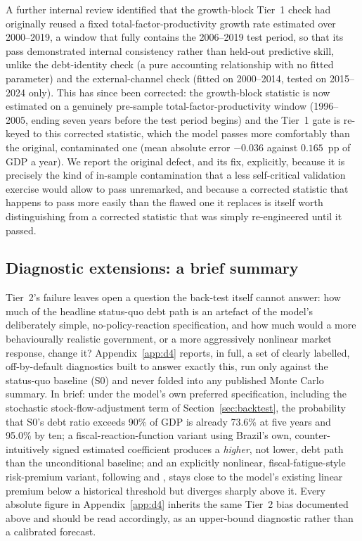 \documentclass[11pt,a4paper]{article}
\begin{document}
A further internal review identified that the growth-block Tier~1 check had originally reused a fixed total-factor-productivity growth rate estimated over 2000--2019, a window that fully contains the 2006--2019 test period, so that its pass demonstrated internal consistency rather than held-out predictive skill, unlike the debt-identity check (a pure accounting relationship with no fitted parameter) and the external-channel check (fitted on 2000--2014, tested on 2015--2024 only). This has since been corrected: the growth-block statistic is now estimated on a genuinely pre-sample total-factor-productivity window (1996--2005, ending seven years before the test period begins) and the Tier~1 gate is re-keyed to this corrected statistic, which the model passes more comfortably than the original, contaminated one (mean absolute error $-0.036$ against $0.165$~pp of GDP a year). We report the original defect, and its fix, explicitly, because it is precisely the kind of in-sample contamination that a less self-critical validation exercise would allow to pass unremarked, and because a corrected statistic that happens to pass more easily than the flawed one it replaces is itself worth distinguishing from a corrected statistic that was simply re-engineered until it passed.

\subsection{Diagnostic extensions: a brief summary}
\label{sec:d4}

Tier~2's failure leaves open a question the back-test itself cannot answer: how much of the headline status-quo debt path is an artefact of the model's deliberately simple, no-policy-reaction specification, and how much would a more behaviourally realistic government, or a more aggressively nonlinear market response, change it? Appendix~\ref{app:d4} reports, in full, a set of clearly labelled, off-by-default diagnostics built to answer exactly this, run only against the status-quo baseline (\textsc{S0}) and never folded into any published Monte Carlo summary. In brief: under the model's own preferred specification, including the stochastic stock-flow-adjustment term of Section~\ref{sec:backtest}, the probability that \textsc{S0}'s debt ratio exceeds 90\% of GDP is already 73.6\% at five years and 95.0\% by ten; a fiscal-reaction-function variant using Brazil's own, counter-intuitively signed estimated coefficient produces a \emph{higher}, not lower, debt path than the unconditional baseline; and an explicitly nonlinear, fiscal-fatigue-style risk-premium variant, following \citet{ghoshkimmendozaostryqureshi2013} and \citet{bi2012}, stays close to the model's existing linear premium below a historical threshold but diverges sharply above it. Every absolute figure in Appendix~\ref{app:d4} inherits the same Tier~2 bias documented above and should be read accordingly, as an upper-bound diagnostic rather than a calibrated forecast.
\end{document}
